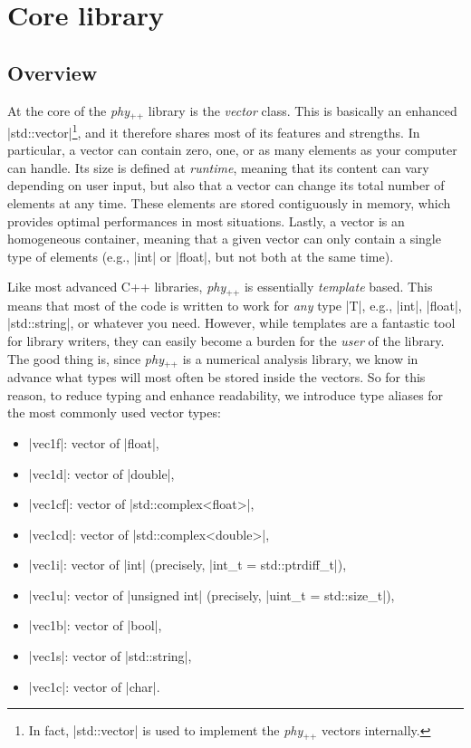 \documentclass[12pt]{report}
\newcommand{\phypp}{\textit{phy}$_{\text{++}}$\xspace}
\newcommand{\stdvec}{\cppinline|std::vector|\xspace}
\begin{document}
\chapter{Core library \label{SEC:core}}

\section{Overview \label{SEC:core:overview}}
At the core of the \phypp library is the \emph{vector} class. This is basically an enhanced \stdvec\footnote{In fact, \stdvec is used to implement the \phypp vectors internally.}, and it therefore shares most of its features and strengths. In particular, a vector can contain zero, one, or as many elements as your computer can handle. Its size is defined at \emph{runtime}, meaning that its content can vary depending on user input, but also that a vector can change its total number of elements at any time. These elements are stored contiguously in memory, which provides optimal performances in most situations. Lastly, a vector is an homogeneous container, meaning that a given vector can only contain a single type of elements (e.g., \cppinline|int| or \cppinline|float|, but not both at the same time).

Like most advanced C++ libraries, \phypp is essentially \emph{template} based. This means that most of the code is written to work for \emph{any} type \cppinline|T|, e.g., \cppinline|int|, \cppinline|float|, \cppinline|std::string|, or whatever you need. However, while templates are a fantastic tool for library writers, they can easily become a burden for the \emph{user} of the library. The good thing is, since \phypp is a numerical analysis library, we know in advance what types will most often be stored inside the vectors. So for this reason, to reduce typing and enhance readability, we introduce type aliases for the most commonly used vector types:
\begin{itemize}
\item \cppinline|vec1f|: vector of \cppinline|float|,
\item \cppinline|vec1d|: vector of \cppinline|double|,
\item \cppinline|vec1cf|: vector of \cppinline|std::complex<float>|,
\item \cppinline|vec1cd|: vector of \cppinline|std::complex<double>|,
\item \cppinline|vec1i|: vector of \cppinline|int| (precisely, \cppinline|int_t = std::ptrdiff_t|),
\item \cppinline|vec1u|: vector of \cppinline|unsigned int| (precisely, \cppinline|uint_t = std::size_t|),
\item \cppinline|vec1b|: vector of \cppinline|bool|,
\item \cppinline|vec1s|: vector of \cppinline|std::string|,
\item \cppinline|vec1c|: vector of \cppinline|char|.
\end{itemize}
\end{document}
